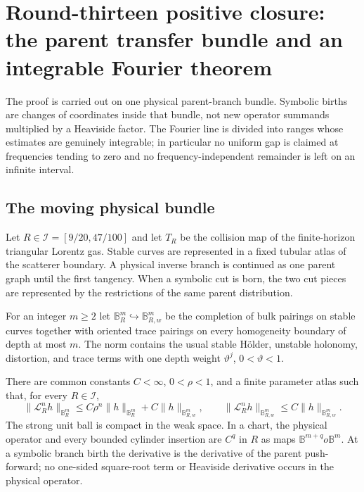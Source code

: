 \section{Round-thirteen positive closure: the parent transfer bundle and an integrable Fourier theorem}
\label{sec:r13-a2}

The proof is carried out on one physical parent-branch bundle.  Symbolic
births are changes of coordinates inside that bundle, not new operator
summands multiplied by a Heaviside factor.  The Fourier line is divided into
ranges whose estimates are genuinely integrable; in particular no uniform
gap is claimed at frequencies tending to zero and no frequency-independent
remainder is left on an infinite interval.

\subsection{The moving physical bundle}

Let $R\in\mathcal I=[9/20,47/100]$ and let $T_R$ be the collision map of the
finite-horizon triangular Lorentz gas.  Stable curves are represented in a
fixed tubular atlas of the scatterer boundary.  A physical inverse branch is
continued as one parent graph until the first tangency.  When a symbolic cut
is born, the two cut pieces are represented by the restrictions of the same
parent distribution.

For an integer $m\ge2$ let $\mathbb B_R^m\hookrightarrow\mathbb B_{R,w}^m$
be the completion of bulk pairings on stable curves together with oriented
trace pairings on every homogeneity boundary of depth at most $m$.  The norm
contains the usual stable Hölder, unstable holonomy, distortion, and trace
terms with one depth weight $\vartheta^j$, $0<\vartheta<1$.

\begin{theorem}
\label{thm:r13-a2-bundle}
There are common constants $C<\infty$, $0<\rho<1$, and a finite parameter
atlas such that, for every $R\in\mathcal I$,
\[
 \|\mathcal L_R^nh\|_{\mathbb B_R^m}
 \le C\rho^n\|h\|_{\mathbb B_R^m}
      +C\|h\|_{\mathbb B_{R,w}^m},
 \qquad
 \|\mathcal L_R^nh\|_{\mathbb B_{R,w}^m}
 \le C\|h\|_{\mathbb B_{R,w}^m}.
\]
The strong unit ball is compact in the weak space.  In a chart, the physical
operator and every bounded cylinder insertion are $C^q$ in $R$ as maps
$\mathbb B^{m+q}	o\mathbb B^m$.  At a symbolic branch birth the derivative
is the derivative of the parent push-forward; no one-sided square-root term or
Heaviside derivative occurs in the physical operator.
\end{theorem}

